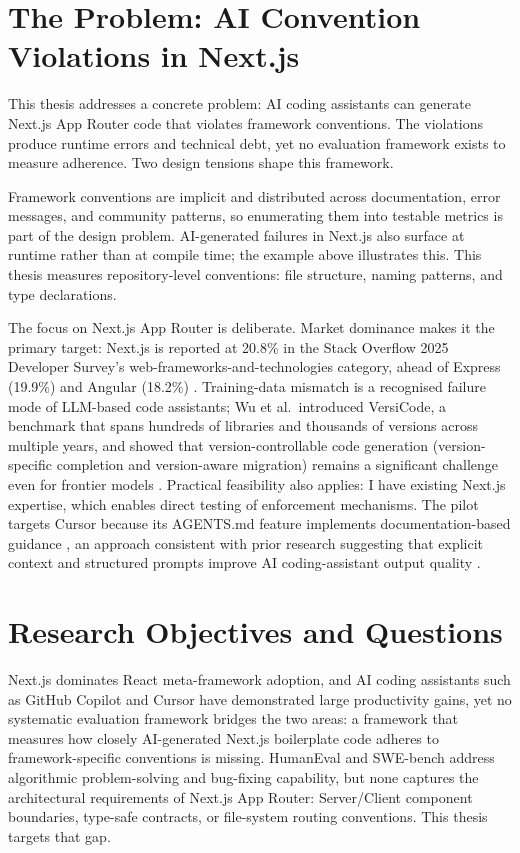\documentclass[12pt,a4paper]{report}
\begin{document}
\section{The Problem: AI Convention Violations in Next.js}

This thesis addresses a concrete problem: AI coding assistants can generate Next.js App Router code that violates framework conventions. The violations produce runtime errors and technical debt, yet no evaluation framework exists to measure adherence. Two design tensions shape this framework.

Framework conventions are implicit and distributed across documentation, error messages, and community patterns, so enumerating them into testable metrics is part of the design problem. AI-generated failures in Next.js also surface at runtime rather than at compile time; the example above illustrates this. This thesis measures repository-level conventions: file structure, naming patterns, and type declarations.

The focus on Next.js App Router is deliberate. Market dominance makes it the primary target: Next.js is reported at 20.8\% in the Stack Overflow 2025 Developer Survey's web-frameworks-and-technologies category, ahead of Express (19.9\%) and Angular (18.2\%) \parencite[1, Stack Overflow Developer Survey]{stackoverflow2025}. Training-data mismatch is a recognised failure mode of {LLM}-based code assistants; Wu et al.\ introduced VersiCode, a benchmark that spans hundreds of libraries and thousands of versions across multiple years, and showed that version-controllable code generation (version-specific completion and version-aware migration) remains a significant challenge even for frontier models \parencite{versicode2024}. Practical feasibility also applies: I have existing Next.js expertise, which enables direct testing of enforcement mechanisms. The pilot targets Cursor because its AGENTS.md feature implements documentation-based guidance \parencite{cursor2024docs}, an approach consistent with prior research suggesting that explicit context and structured prompts improve AI coding-assistant output quality \parencite{barke2022grounded,zhang2023practices}.

\section{Research Objectives and Questions}
\label{sec:research-objectives}

Next.js dominates React meta-framework adoption, and AI coding assistants such as GitHub Copilot and Cursor have demonstrated large productivity gains, yet no systematic evaluation framework bridges the two areas: a framework that measures how closely AI-generated Next.js boilerplate code adheres to framework-specific conventions is missing. HumanEval and SWE-bench address algorithmic problem-solving and bug-fixing capability, but none captures the architectural requirements of Next.js App Router: Server/Client component boundaries, type-safe contracts, or file-system routing conventions. This thesis targets that gap.
\end{document}
